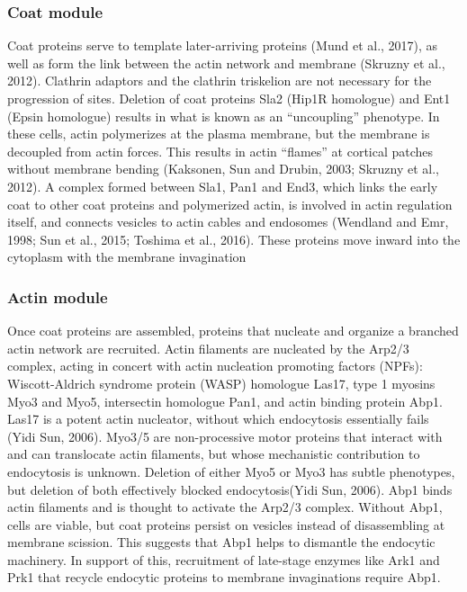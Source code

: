 			
			\subsubsection{Coat module}
Coat proteins serve to template later-arriving proteins (Mund et al., 2017), as well as form the link between the actin network and membrane (Skruzny et al., 2012). Clathrin adaptors and the clathrin triskelion are not necessary for the progression of sites. Deletion of coat proteins Sla2 (Hip1R homologue) and Ent1 (Epsin homologue) results in what is known as an “uncoupling” phenotype. In these cells, actin polymerizes at the plasma membrane, but the membrane is decoupled from actin forces. This results in actin “flames” at cortical patches without membrane bending (Kaksonen, Sun and Drubin, 2003; Skruzny et al., 2012). A complex formed between Sla1, Pan1 and End3, which links the early coat to other coat proteins and polymerized actin, is involved in actin regulation itself, and connects vesicles to actin cables and endosomes (Wendland and Emr, 1998; Sun et al., 2015; Toshima et al., 2016). These proteins move inward into the cytoplasm with the membrane invagination
			



			\subsubsection{Actin module}
Once coat proteins are assembled, proteins that nucleate and organize a branched actin network are recruited. Actin filaments are nucleated by the Arp2/3 complex, acting in concert with actin nucleation promoting factors (NPFs): Wiscott-Aldrich syndrome protein (WASP) homologue Las17, type 1 myosins Myo3 and Myo5, intersectin homologue Pan1, and actin binding protein Abp1. Las17 is a potent actin nucleator, without which endocytosis essentially fails (Yidi Sun, 2006). Myo3/5 are non-processive motor proteins that interact with and can translocate actin filaments, but whose mechanistic contribution to endocytosis is unknown. Deletion of either Myo5 or Myo3 has subtle phenotypes, but deletion of both effectively blocked endocytosis(Yidi Sun, 2006). Abp1 binds actin filaments and is thought to activate the Arp2/3 complex. Without Abp1, cells are viable, but coat proteins persist on vesicles instead of disassembling at membrane scission. This suggests that Abp1 helps to dismantle the endocytic machinery.  In support of this, recruitment of late-stage enzymes like Ark1 and Prk1 that recycle endocytic proteins to membrane invaginations require Abp1. 


